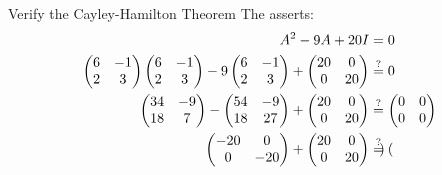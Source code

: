 \begin{example}{Verify the Cayley-Hamilton Theorem}
  The  asserts:
  \begin{align*}
    A^{2} - 9 A + 20I &= 0 \\
    \begin{pmatrix}
      6 & -1 \\
      2 & 3
    \end{pmatrix}
          \begin{pmatrix}
            6 & -1 \\
            2 & 3
          \end{pmatrix} -
                9
                \begin{pmatrix}
                  6 & -1 \\
                  2 & 3
                \end{pmatrix} +
                      \begin{pmatrix}
                        20 & 0 \\
                        0 & 20
                      \end{pmatrix}
        &\overset{?}{=} 0 \\
    \begin{pmatrix}
      34 & -9 \\
      18 & 7
    \end{pmatrix} -
           \begin{pmatrix}
             54 & -9 \\
             18 & 27
           \end{pmatrix} +
                  \begin{pmatrix}
                    20 & 0 \\
                    0 & 20
                  \end{pmatrix}
                        &\overset{?}{=}
                          \begin{pmatrix}
                            0 & 0 \\
                            0 & 0
                          \end{pmatrix} \\
    \begin{pmatrix}
      -20 & 0 \\
      0 & -20
    \end{pmatrix} +
          \begin{pmatrix}
            20 & 0 \\
            0 & 20
          \end{pmatrix} &\overset{?}{=}
                          \begin{pmatrix}

\end{pmatrix}
\end{align*}
\end{example}
